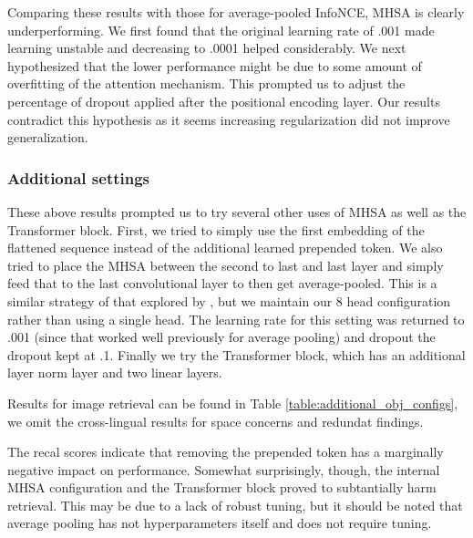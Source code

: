 Comparing these results with those for average-pooled InfoNCE, MHSA is clearly underperforming.
We first found that the original learning rate of .001 made learning unstable and decreasing to .0001 helped considerably.
We next hypothesized that the lower performance might be due to some amount of overfitting of the attention mechanism.
This prompted us to adjust the percentage of dropout applied after the positional encoding layer.
Our results contradict this hypothesis as it seems increasing regularization did not improve generalization.




\subsubsection{Additional settings}
\label{section:addition_settings}
These above results prompted us to try several other uses of MHSA as well as the Transformer block.
First, we tried to simply use the first embedding of the flattened sequence instead of the additional learned prepended token.
We also tried to place the MHSA between the second to last and last layer and simply feed that to the last convolutional layer to then get average-pooled.
This is a similar strategy of that explored by \cite{ohishi2020trilingual}, but we maintain our 8 head configuration rather than using a single head.
The learning rate for this setting was returned to .001 (since that worked well previously for average pooling) and dropout the dropout kept at .1.
Finally we try the Transformer block, which has an additional layer norm layer and two linear layers.

Results for image retrieval can be found in Table \ref{table:additional_obj_configs}, we omit the cross-lingual results for space concerns and redundat findings.

The recal scores indicate that removing the prepended token has a marginally negative impact on performance.
Somewhat surprisingly, though, the internal MHSA configuration and the Transformer block proved to subtantially harm retrieval.
This may be due to a lack of robust tuning, but it should be noted that average pooling has not hyperparameters itself and does not require tuning.





